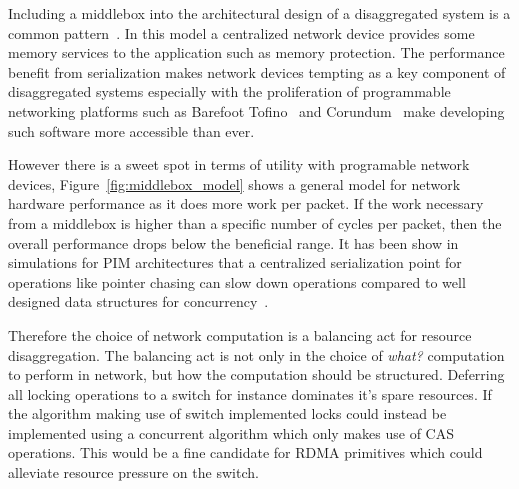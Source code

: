 Including a middlebox into the architectural design of a disaggregated system is
a common pattern~\cite{disandapp}. In this model a centralized network device
provides some memory services to the application such as memory protection. The
performance benefit from serialization makes network devices tempting as a key
component of disaggregated systems especially with the proliferation of
programmable networking platforms such as Barefoot Tofino~\cite{tofino3} and
Corundum~\cite{corundum} make developing such software more accessible than ever.

However there is a sweet spot in terms of utility with programable network
devices, Figure~\ref{fig:middlebox_model} shows a general model for network hardware
performance as it does more work per packet. If the work necessary from a
middlebox is higher than a specific number of cycles per packet, then the
overall performance drops below the beneficial range. It has been show in
simulations for PIM architectures that a centralized serialization point for
operations like pointer chasing can slow down operations compared to well
designed data structures for concurrency~.

Therefore the choice of network computation is a balancing act for resource
disaggregation. The balancing act is not only in the choice of \textit{what?}
computation to perform in network, but how the computation should be structured.
Deferring all locking operations to a switch for instance dominates it's spare
resources. If the algorithm making use of switch implemented locks could instead
be implemented using a concurrent algorithm which only makes use of CAS
operations. This would be a fine candidate for RDMA primitives which could
alleviate resource pressure on the switch.

